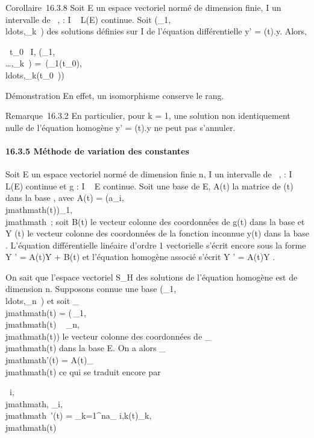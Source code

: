 \documentclass[]{article}
\begin{document}
Corollaire~16.3.8 Soit E un espace vectoriel normé de dimension finie, I
un intervalle de ~, \ell : I \rightarrow~ L(E) continue. Soit
(\phi_1,\\ldots,\phi_k~)
des solutions définies sur I de l'équation différentielle y' = \ell(t).y.
Alors,

\forall~t_0~ \in I,
\mathrmrg(\phi_1,\\\ldots,\phi_k~)
=\
\mathrmrg(\phi_1(t_0),\\ldots,\phi_k(t_0~))

Démonstration En effet, un isomorphisme conserve le rang.

Remarque~16.3.2 En particulier, pour k = 1, une solution non
identiquement nulle de l'équation homogène y' = \ell(t).y ne peut pas
s'annuler.

\paragraph{16.3.5 Méthode de variation des constantes}

Soit E un espace vectoriel normé de dimension finie n, I un intervalle
de \mathbb{R}~, \ell : I \rightarrow~ L(E) continue et g : I \rightarrow~ E continue. Soit  une base de E,
A(t) la matrice de \ell(t) dans la base , avec A(t) =
(a_i,\\jmathmath(t))_1\leqi,\\jmathmath\leqn~; soit B(t) le vecteur colonne des
coordonnées de g(t) dans la base  et Y (t) le vecteur colonne des
coordonnées de la fonction inconnue y(t) dans la base \mathcal{E}. L'équation
différentielle linéaire d'ordre 1 vectorielle s'écrit encore sous la
forme Y ' = A(t)Y + B(t) et l'équation homogène associé s'écrit Y ' =
A(t)Y .

On sait que l'espace vectoriel S_H des solutions de l'équation
homogène est de dimension n. Supposons connue une base
(\phi_1,\\ldots,\phi_n~)
et soit \Phi_\\jmathmath(t) = \left
(\matrix\,\phi_1,\\jmathmath(t)
\cr \⋮~
\cr \phi_n,\\jmathmath(t)\right ) le vecteur
colonne des coordonnées de \phi_\\jmathmath(t) dans la base E. On a alors
\Phi_\\jmathmath'(t) = A(t)\Phi_\\jmathmath(t) ce qui se traduit encore par

\forall~i,\\jmathmath, \phi_i,\\jmathmath~'(t) =
\sum _k=1^na_
i,k(t)\psi_k,\\jmathmath(t)
\end{document}
